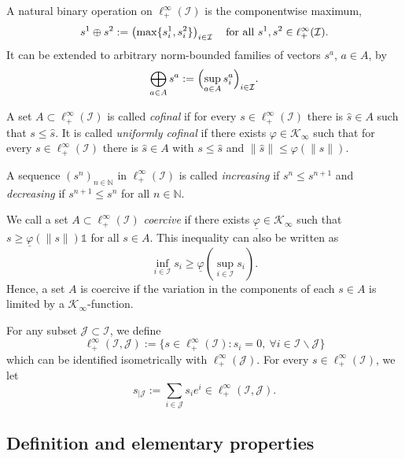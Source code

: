 \documentclass[10pt, oneside, a4paper]{article}
\newcommand{\N}{\mathbb{N}}
\newcommand{\unit}{\mathds{1}}
\newcommand{\IC}{\mathcal{I}}
\newcommand{\JC}{\mathcal{J}}
\newcommand{\KC}{\mathcal{K}}
\begin{document}
A natural binary operation on $\ell^{\infty}_+(\IC)$ is the componentwise maximum,%
\begin{equation*}
  s^1 \oplus s^2 := \left(\max\{s^1_i,s^2_i\}\right)_{i \in \IC} \mbox{\quad for all\ } s^1,s^2 \in \ell^{\infty}_+(\IC).%
\end{equation*}
It can be extended to arbitrary norm-bounded families of vectors $s^a$, $a \in A$, by%
\begin{equation*}
  \bigoplus_{a \in A}s^a := \Bigl(\sup_{a\in A}s^a_i\Bigr)_{i \in \IC}.%
\end{equation*}

A set $A \subset \ell^{\infty}_+(\IC)$ is called \emph{cofinal} if for every $s \in \ell^{\infty}_+(\IC)$ there is $\hat{s} \in A$ such that $s \leq \hat{s}$. It is called \emph{uniformly cofinal} if there exists $\varphi \in \KC_{\infty}$ such that for every $s \in \ell^{\infty}_+(\IC)$ there is $\hat{s} \in A$ with $s \leq \hat{s}$ and $\|\hat{s}\| \leq \varphi(\|s\|)$.%

A sequence $(s^n)_{n \in \N}$ in $\ell^{\infty}_+(\IC)$ is called \emph{increasing} if $s^n \leq s^{n+1}$ and \emph{decreasing} if $s^{n+1} \leq s^n$ for all $n \in \N$.%

We call a set $A \subset \ell^{\infty}_+(\IC)$ \emph{coercive} if there exists $\underline{\varphi} \in \KC_{\infty}$ such that $s \geq \underline{\varphi}(\|s\|)\unit$ for all $s \in A$. This inequality can also be written as%
\begin{equation*}
  \inf_{i\in\IC}s_i \geq \underline{\varphi}(\sup_{i\in\IC}s_i).%
\end{equation*}
Hence, a set $A$ is coercive if the variation in the components of each $s \in A$ is limited by a $\KC_{\infty}$-function.%

For any subset $\JC \subset \IC$, we define%
\begin{equation*}
  \ell^{\infty}_+(\IC,\JC) := \{ s \in \ell^{\infty}_+(\IC) : s_i = 0,\ \forall i \in \IC \backslash \JC \}%
\end{equation*}
which can be identified isometrically with $\ell^{\infty}_+(\JC)$. For every $s \in \ell^{\infty}_+(\IC)$, we let%
\begin{equation*}
  s_{|\JC} := \sum_{i\in \JC}s_ie^i \in \ell^{\infty}_+(\IC,\JC).%
\end{equation*}

\subsection{Definition and elementary properties}\label{subsec_def_props}
\end{document}
